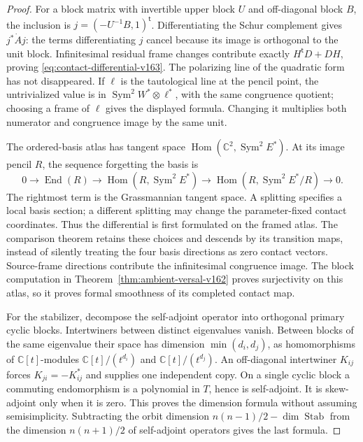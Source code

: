 \documentclass[11pt,reqno]{amsart}
\numberwithin{equation}{section}
\theoremstyle{definition}\newtheorem{definition}[theorem]{Definition}
\theoremstyle{remark}\newtheorem{remark}[theorem]{Remark}
\newcommand{\C}{\mathbb C}\newcommand{\Q}{\mathbb Q}
\DeclareMathOperator{\Sym}{Sym}\DeclareMathOperator{\Gr}{Gr}
\DeclareMathOperator{\Hom}{Hom}\DeclareMathOperator{\Tot}{Tot}
\begin{document}
\begin{proof}
For a block matrix with invertible upper block $U$ and off-diagonal
block $B$, the inclusion is $j=(-U^{-1}B,1)^{\mathsf t}$. Differentiating
the Schur complement gives $j^*\dot A j$: the terms differentiating
$j$ cancel because its image is orthogonal to the unit block.
Infinitesimal residual frame changes contribute exactly
$H^{\mathsf t}D+DH$, proving \eqref{eq:contact-differential-v163}.
The polarizing line of the quadratic form has not disappeared. If
$\ell$ is the tautological line at the pencil point, the untrivialized
value is in $\Sym^2W^*\otimes\ell^*$, with the same congruence
quotient; choosing a frame of $\ell$ gives the displayed formula.
Changing it multiplies both numerator and congruence image by the
same unit.

The ordered-basis atlas has tangent space $\Hom(\C^2,\Sym^2E^*)$.
At its image pencil $R$, the sequence forgetting the basis is
\[
 0\longrightarrow\operatorname{End}(R)
 \longrightarrow\Hom(R,\Sym^2E^*)
 \longrightarrow\Hom(R,\Sym^2E^*/R)\longrightarrow0.
\]
The rightmost term is the Grassmannian tangent space. A splitting
specifies a local basis section; a different splitting may change
the parameter-fixed contact coordinates. Thus the differential is
first formulated on the framed atlas. The comparison theorem
retains these choices and descends by its transition maps, instead
of silently treating the four basis directions as zero contact
vectors. Source-frame directions contribute the infinitesimal
congruence image. The block computation in
Theorem~\ref{thm:ambient-versal-v162} proves surjectivity on this
atlas, so it proves formal smoothness of its completed contact map.

For the stabilizer, decompose the self-adjoint operator into
orthogonal primary cyclic blocks. Intertwiners between distinct
eigenvalues vanish. Between blocks of the same eigenvalue their
space has dimension $\min(d_i,d_j)$, as homomorphisms of
$\C[t]$-modules $\C[t]/(t^{d_i})$ and $\C[t]/(t^{d_j})$.
An off-diagonal intertwiner $K_{ij}$ forces
$K_{ji}=-K_{ij}^*$ and supplies one independent copy. On a single
cyclic block a commuting endomorphism is a polynomial in $T$,
hence is self-adjoint. It is skew-adjoint only when it is zero.
This proves the dimension formula without assuming semisimplicity.
Subtracting the orbit dimension
$n(n-1)/2-\dim\operatorname{Stab}$ from the dimension
$n(n+1)/2$ of self-adjoint operators gives the last formula.
\end{proof}
\end{document}
